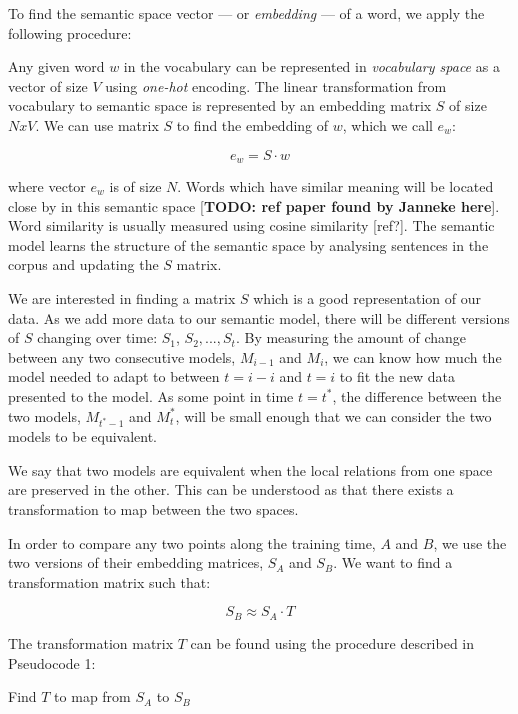 \documentclass{article} %
\begin{document}
To find the semantic space vector --- or \textit{embedding} --- of a word, we apply the following procedure:

Any given word $w$ in the vocabulary can be represented in \textit{vocabulary space} as a vector of size $V$ using \textit{one-hot} encoding. The linear transformation from vocabulary to semantic space is represented by an embedding matrix $S$ of size $NxV$. We can use matrix $S$ to find the embedding of $w$, which we call $e_w$:

$$e_w = S \cdot w$$

where vector $e_w$ is of size $N$. Words which have similar meaning will be located close by in this semantic space [\textbf{TODO: ref paper found by Janneke here}]. Word similarity is usually measured using cosine similarity [ref?]. The semantic model learns the structure of the semantic space by analysing sentences in the corpus and updating the $S$ matrix.

We are interested in finding a matrix $S$ which is a good representation of our data. As we add more data to our semantic model, there will be different versions of $S$ changing over time: $S_1$, $S_2, ..., S_t$. By measuring the amount of change between any two consecutive models, $M_{i-1}$ and $M_i$, we can know how much the model needed to adapt to between $t=i-i$ and $t=i$ to fit the new data presented to the model. As some point in time $t=t^\ast$, the difference between the two models, $M_{t^\ast-1}$ and $M_t^\ast$, will be small enough that we can consider the two models to be equivalent.

We say that two models are equivalent when the local relations from one space are preserved in the other. This can be understood as that there exists a transformation to map between the two spaces.

In order to compare any two points along the training time, $A$ and $B$, we use the two versions of their embedding matrices, $S_A$ and $S_B$. We want to find a transformation matrix such that:

$$S_B \approx S_A \cdot T$$

The transformation matrix $T$ can be found using the procedure described in Pseudocode 1:

\begin{algorithm}[H]
 \caption{Find $T$ to map from $S_A$ to $S_B$}
\end{algorithm}
\end{document}
